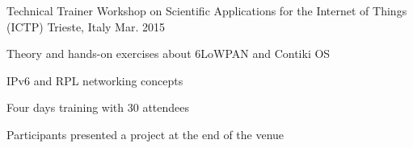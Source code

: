 \begin{cventries}
  \cventry
    {Technical Trainer} %
    {Workshop on Scientific Applications for the Internet of Things (ICTP)} %
    {Trieste, Italy} %
    {Mar. 2015} %
    {
      \begin{cvitems} %
        \item {Theory and hands-on exercises about 6LoWPAN and Contiki OS}
        \item {IPv6 and RPL networking concepts}
        \item {Four days training with 30 attendees}
        \item {Participants presented a project at the end of the venue }
      \end{cvitems}
    }

\end{cventries}
